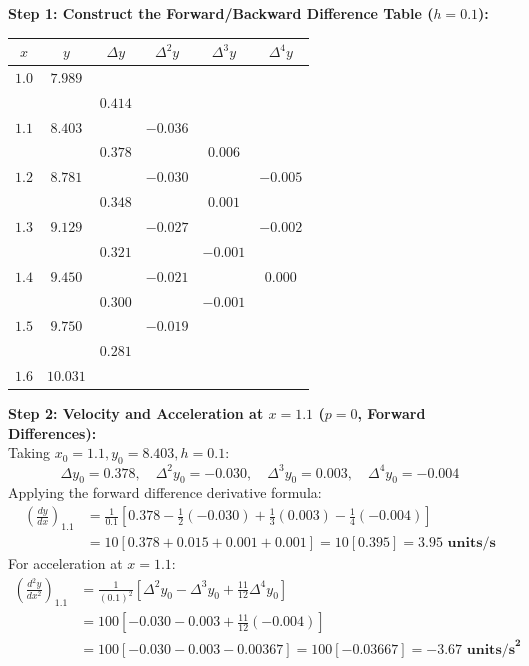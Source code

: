 \noindent\textbf{Step 1: Construct the Forward/Backward Difference Table ($h = 0.1$):}
\begin{center}
\small
\renewcommand{\arraystretch}{1.2}
\begin{tabular}{|c|c|c|c|c|c|}
\hline
$x$ & $y$ & $\Delta y$ & $\Delta^2 y$ & $\Delta^3 y$ & $\Delta^4 y$ \\
\hline
$1.0$ & $7.989$ & & & & \\
      &         & $0.414$ & & & \\
$1.1$ & $8.403$ & & $-0.036$ & & \\
      &         & $\mathbf{0.378}$ & & $\mathbf{0.006}$ & \\
$1.2$ & $8.781$ & & $\mathbf{-0.030}$ & & $\mathbf{-0.005}$ \\
      &         & $0.348$ & & $0.001$ & \\
$1.3$ & $9.129$ & & $-0.027$ & & $-0.002$ \\
      &         & $0.321$ & & $-0.001$ & \\
$1.4$ & $9.450$ & & $-0.021$ & & $0.000$ \\
      &         & $0.300$ & & $-0.001$ & \\
$1.5$ & $9.750$ & & $\mathbf{-0.019}$ & & \\
      &         & $\mathbf{0.281}$ & & & \\
$1.6$ & $10.031$& & & & \\
\hline
\end{tabular}
\end{center}

\medskip
\noindent\textbf{Step 2: Velocity and Acceleration at $x = 1.1$ ($p = 0$, Forward Differences):} \\
Taking $x_0 = 1.1, y_0 = 8.403, h = 0.1$:
\begin{equation}
    \Delta y_0 = 0.378, \quad \Delta^2 y_0 = -0.030, \quad \Delta^3 y_0 = 0.003, \quad \Delta^4 y_0 = -0.004
\end{equation}
Applying the forward difference derivative formula:
\begin{align}
    \left(\frac{dy}{dx}\right)_{1.1} &= \frac{1}{0.1}\left[ 0.378 - \frac{1}{2}(-0.030) + \frac{1}{3}(0.003) - \frac{1}{4}(-0.004) \right] \nonumber \\
    &= 10 \left[ 0.378 + 0.015 + 0.001 + 0.001 \right] = 10 [0.395] = \mathbf{3.95 \text{ units/s}}
\end{align}
For acceleration at $x = 1.1$:
\begin{align}
    \left(\frac{d^2 y}{dx^2}\right)_{1.1} &= \frac{1}{(0.1)^2}\left[ \Delta^2 y_0 - \Delta^3 y_0 + \frac{11}{12}\Delta^4 y_0 \right] \nonumber \\
    &= 100 \left[ -0.030 - 0.003 + \frac{11}{12}(-0.004) \right] \nonumber \\
    &= 100 \left[ -0.030 - 0.003 - 0.00367 \right] = 100[-0.03667] = \mathbf{-3.67 \text{ units/s}^2}
\end{align}


